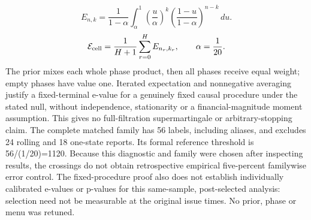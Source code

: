 \documentclass[10pt,a4paper]{article}
\begin{document}
\[
E_{n,k}=\frac{1}{1-\alpha}\int_\alpha^1\left(\frac{u}{\alpha}\right)^k\left(\frac{1-u}{1-\alpha}\right)^{n-k}\,du.
\]
\[
\mathcal E_{\rm cell}=\frac{1}{H+1}\sum_{r=0}^{H}E_{n_r,k_r},\qquad\alpha=\frac1{20}.
\]
The prior mixes each whole phase product, then all phases receive equal weight; empty phases have value one. Iterated expectation and nonnegative averaging justify a fixed-terminal e-value for a genuinely fixed causal procedure under the stated null, without independence, stationarity or a financial-magnitude moment assumption. This gives no full-filtration supermartingale or arbitrary-stopping claim. The complete matched family has 56 labels, including aliases, and excludes 24 rolling and 18 one-state reports. Its formal reference threshold is 56/(1/20)=1120. Because this diagnostic and family were chosen after inspecting results, the crossings do not obtain retrospective empirical five-percent familywise error control. The fixed-procedure proof also does not establish individually calibrated e-values or p-values for this same-sample, post-selected analysis: selection need not be measurable at the original issue times. No prior, phase or menu was retuned.
\end{document}
